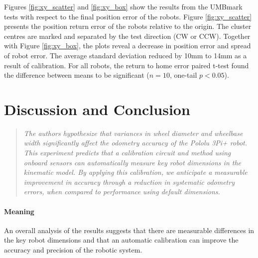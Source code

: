 \documentclass[conference]{IEEEtran}
\begin{document}
Figures \ref{fig:xy_scatter} and \ref{fig:xy_box} show the results from the UMBmark tests with respect to the final position error of the robots. Figure \ref{fig:xy_scatter} presents the position return error of the robots relative to the origin. The cluster centres are marked and separated by the test direction (CW or CCW). Together with Figure \ref{fig:xy_box}, the plots reveal a decrease in position error and spread of robot error. 
The average standard deviation reduced by 10mm to 14mm as a result of calibration.
For all robots, the return to home error paired  t-test found the difference between means to be
significant ($n = 10$, one-tail $p < 0.05$). 





\section{Discussion and Conclusion}\label{sec:discussion_conclusion}


\begin{quote}
    \emph{
    The authors hypothesize that variances in wheel diameter and wheelbase width significantly affect the odometry accuracy of the Pololu 3Pi+ robot.
    This experiment predicts that a calibration circuit and method using onboard sensors can automatically measure key robot dimensions in the kinematic model.
    By applying this calibration, we anticipate a measurable improvement in accuracy through a reduction in systematic odometry errors, when compared to performance using default dimensions.
    }
\end{quote}

\paragraph{Meaning}
An overall analysis of the results suggests that there are measurable differences in the key robot dimensions and that an automatic calibration can improve the accuracy and precision of the robotic system. 
\end{document}
